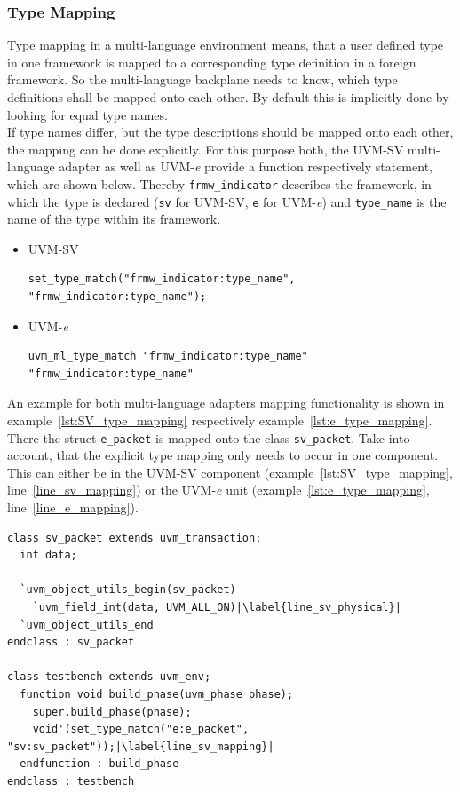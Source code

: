 \subsubsection{Type Mapping}
Type mapping in a multi-language environment means, that a user defined type in
one framework is mapped to a corresponding type definition in a foreign framework. So the multi-language
backplane needs to know, which type definitions shall be mapped onto each other. By default this is implicitly done by
looking for equal type names.\\
If type names differ, but the type descriptions should be mapped onto each other, the mapping can be done explicitly.
For this purpose both, the UVM-SV multi-language adapter as well as UVM-\textit{e} provide a function respectively
statement, which are shown below. Thereby \lstinline$frmw_indicator$ describes the framework, in which the type is
declared (\lstinline$sv$ for UVM-SV, \lstinline$e$ for UVM-\textit{e}) and \lstinline$type_name$ is the name
of the type within its framework.
\begin{itemize}
  \item{UVM-SV}
\begin{lstlisting}
set_type_match("frmw_indicator:type_name", "frmw_indicator:type_name");
\end{lstlisting} 
  \item{UVM-\textit{e}}
\begin{lstlisting}
uvm_ml_type_match "frmw_indicator:type_name" "frmw_indicator:type_name"
\end{lstlisting} 
\end{itemize}

An example for both multi-language adapters mapping functionality is shown in example~\ref{lst:SV_type_mapping}
respectively example~\ref{lst:e_type_mapping}. There the struct \lstinline$e_packet$ is mapped onto the class
\lstinline$sv_packet$. Take into account, that the explicit type mapping only needs to occur in one component. This can either be in
the UVM-SV component (example~\ref{lst:SV_type_mapping}, line~\ref{line_sv_mapping}) or the
UVM-\textit{e} unit (example~\ref{lst:e_type_mapping}, line~\ref{line_e_mapping}).

\lstset{language=SystemVerilog, numbers = left, escapechar=|, breaklines=true}
\begin{lstlisting}[frame=htrbl, caption={SystemVerilog: mapping \lstinline$sv_packet$ onto \lstinline$e_packet$},
label={lst:SV_type_mapping}]
class sv_packet extends uvm_transaction;
  int data;
  
  `uvm_object_utils_begin(sv_packet)
    `uvm_field_int(data, UVM_ALL_ON)|\label{line_sv_physical}|
  `uvm_object_utils_end
endclass : sv_packet

class testbench extends uvm_env;
  function void build_phase(uvm_phase phase);
    super.build_phase(phase);
    void'(set_type_match("e:e_packet", "sv:sv_packet"));|\label{line_sv_mapping}|
  endfunction : build_phase
endclass : testbench
\end{lstlisting}

